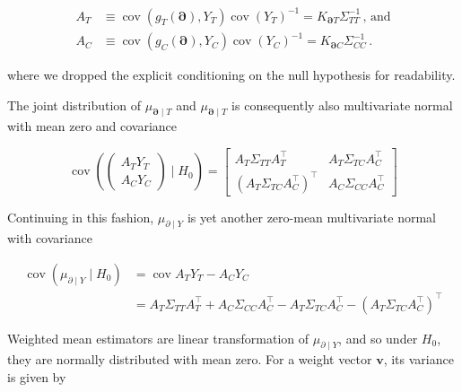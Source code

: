 \documentclass[letter]{article}
\newcommand{\genericdel}[3]{%
      \left#1#3\right#2
    }
\newcommand{\del}[1]{\genericdel(){#1}}
\DeclareMathOperator{\cov}{{cov}}
\newcommand{\trans}{^{\intercal}}
\newcommand{\vvec}{\mathbold{v}}
\newcommand{\boundary}{\partial}
\newcommand{\sentinels}{\bm{\boundary}}
\begin{document}
\begin{equation}
\begin{split}
    A_T &\equiv \cov\del{g_T(\sentinels), Y_T} \cov\del{Y_T}^{-1} = K_{\sentinels T} \Sigma_{TT}^{-1} \,\text{, and} \\
    A_C &\equiv \cov\del{g_C(\sentinels), Y_C} \cov\del{Y_C}^{-1} = K_{\sentinels C} \Sigma_{CC}^{-1}\,.
\end{split}
\end{equation}

where we dropped the explicit conditioning on the null hypothesis for
readability.
    


    	The joint distribution of \(\mu_{\sentinels \mid T}\) and
\(\mu_{\sentinels \mid T}\) is consequently also multivariate normal
with mean zero and covariance

\begin{equation}
    \cov \del{\begin{pmatrix}A_T Y_T \\ A_C Y_C \end{pmatrix} \mid H_0 } = \begin{bmatrix}
                        A_T \Sigma_{TT} A_T\trans & A_T \Sigma_{TC} A_C\trans \\
                        \del{A_T \Sigma_{TC} A_C \trans}\trans & A_C \Sigma_{CC} A_C\trans
                    \end{bmatrix}
\end{equation}

Continuing in this fashion, \(\mu_{\boundary \mid Y}\) is yet another
zero-mean multivariate normal with covariance
    


    	\begin{equation}
\begin{split}
    \cov \del{\mu_{\boundary \mid Y} \mid H_0} &= \cov{ A_T Y_T - A_C Y_C } \\
        &= A_T \Sigma_{TT} A_T\trans + A_C \Sigma_{CC} A_C\trans - A_T \Sigma_{TC} A_C\trans -  \del{A_T\Sigma_{TC} A_C\trans}\trans
\end{split}
\end{equation}
    


    	Weighted mean estimators are linear transformation of
\(\mu_{\boundary \mid Y}\), and so under \(H_0\), they are normally
distributed with mean zero. For a weight vector \(\vvec\), its variance
is given by
\end{document}

